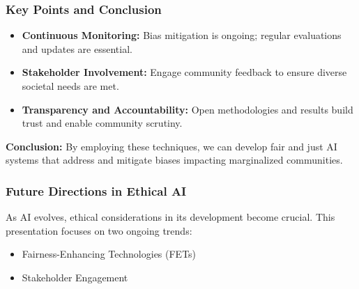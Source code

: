 \documentclass{beamer}
\begin{document}
\begin{frame}[fragile]
    \frametitle{Key Points and Conclusion}
    \begin{itemize}
        \item \textbf{Continuous Monitoring:} Bias mitigation is ongoing; regular evaluations and updates are essential.
        \item \textbf{Stakeholder Involvement:} Engage community feedback to ensure diverse societal needs are met.
        \item \textbf{Transparency and Accountability:} Open methodologies and results build trust and enable community scrutiny.
    \end{itemize}
    \textbf{Conclusion:} By employing these techniques, we can develop fair and just AI systems that address and mitigate biases impacting marginalized communities.
\end{frame}

\begin{frame}[fragile]
    \frametitle{Future Directions in Ethical AI}
    As AI evolves, ethical considerations in its development become crucial. 
    This presentation focuses on two ongoing trends:
    \begin{itemize}
        \item Fairness-Enhancing Technologies (FETs)
        \item Stakeholder Engagement
    \end{itemize}
\end{frame}
\end{document}
